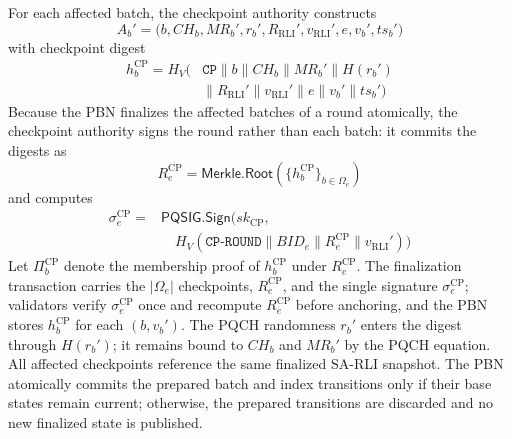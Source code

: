 \documentclass[lettersize,journal]{IEEEtran}
\begin{document}
For each affected batch, the checkpoint authority constructs
\begin{equation}
A_b'=\big(b,CH_b,MR_b',r_b',
R_{\mathrm{RLI}}',v_{\mathrm{RLI}}',e,v_b',ts_b'\big)
\end{equation}
with checkpoint digest
\begin{equation}
\begin{aligned}
h_b^{\mathrm{CP}}=
H_V\big(&\texttt{CP}\parallel b\parallel CH_b\parallel MR_b'
\parallel H(r_b')\\
&\parallel R_{\mathrm{RLI}}'\parallel v_{\mathrm{RLI}}'
\parallel e\parallel v_b'\parallel ts_b'\big)
\end{aligned}
\end{equation}
Because the PBN finalizes the affected batches of a round
atomically, the checkpoint authority signs the round rather than each
batch: it commits the digests as
\begin{equation}
R_e^{\mathrm{CP}}=\mathsf{Merkle.Root}(\{h_b^{\mathrm{CP}}\}_{b\in\Omega_e})
\end{equation}
and computes
\begin{equation}
\begin{aligned}
\sigma_e^{\mathrm{CP}}={}&
\mathsf{PQSIG.Sign}\big(sk_{\mathrm{CP}},\\
&\quad H_V(\texttt{CP-ROUND}\parallel BID_e\parallel R_e^{\mathrm{CP}}
\parallel v_{\mathrm{RLI}}')\big)
\end{aligned}
\end{equation}
Let $\Pi_b^{\mathrm{CP}}$ denote the membership proof of
$h_b^{\mathrm{CP}}$ under $R_e^{\mathrm{CP}}$. The finalization
transaction carries the $|\Omega_e|$ checkpoints, $R_e^{\mathrm{CP}}$, and
the single signature $\sigma_e^{\mathrm{CP}}$; validators verify
$\sigma_e^{\mathrm{CP}}$ once and recompute $R_e^{\mathrm{CP}}$ before
anchoring, and the PBN stores $h_b^{\mathrm{CP}}$ for each $(b,v_b')$. The PQCH randomness $r_b'$ enters the digest through $H(r_b')$; it remains
bound to $CH_b$ and $MR_b'$ by the PQCH equation.
All affected checkpoints reference the same finalized SA-RLI snapshot.
The PBN atomically commits the prepared batch and index transitions
only if their base states remain current; otherwise, the prepared
transitions are discarded and no new finalized state is published.
\end{document}
